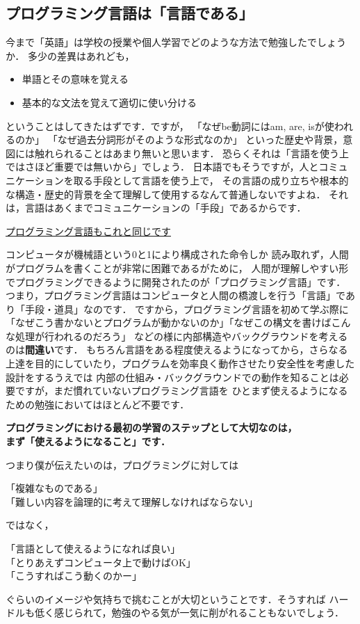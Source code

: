 \documentclass[autodetect-engine,dvi=dvipdfmx,ja=standard,a4j,12pt]{bxjsarticle}
\begin{document}
\subsection*{プログラミング言語は「言語である」}
今まで「英語」は学校の授業や個人学習でどのような方法で勉強したでしょうか．
多少の差異はあれども，
\begin{itemize}
    \item 単語とその意味を覚える
    \item 基本的な文法を覚えて適切に使い分ける
\end{itemize}
ということはしてきたはずです．ですが，
「なぜbe動詞にはam, are, isが使われるのか」
「なぜ過去分詞形がそのような形式なのか」
といった歴史や背景，意図には触れられることはあまり無いと思います．
恐らくそれは「言語を使う上ではさほど重要では無いから」でしょう．
日本語でもそうですが，人とコミュニケーションを取る手段として言語を使う上で，
その言語の成り立ちや根本的な構造・歴史的背景を全て理解して使用するなんて普通しないですよね．
それは，言語はあくまでコミュニケーションの「手段」であるからです．
\begin{center}
    \underline{\Large{プログラミング言語もこれと同じです}}
\end{center}

コンピュータが機械語という0と1により構成された命令しか
読み取れず，人間がプログラムを書くことが非常に困難であるがために，
人間が理解しやすい形でプログラミングできるように開発されたのが「プログラミング言語」です．
つまり，プログラミング言語はコンピュータと人間の橋渡しを行う「言語」であり「手段・道具」なのです．
ですから，プログラミング言語を初めて学ぶ際に「なぜこう書かないとプログラムが動かないのか」「なぜこの構文を書けばこんな処理が行われるのだろう」
などの様に内部構造やバックグラウンドを考えるのは\textbf{間違い}です．
もちろん言語をある程度使えるようになってから，さらなる上達を目的にしていたり，プログラムを効率良く動作させたり安全性を考慮した設計をするうえでは
内部の仕組み・バックグラウンドでの動作を知ることは必要ですが，まだ慣れていないプログラミング言語を
ひとまず使えるようになるための勉強においてはほとんど不要です．
\begin{center}
    \textbf{プログラミングにおける最初の学習のステップとして大切なのは，\\まず「使えるようになること」です．}
\end{center}

つまり僕が伝えたいのは，プログラミングに対しては
\begin{center}
    「複雑なものである」\\
    「難しい内容を論理的に考えて理解しなければならない」
\end{center}
ではなく，
\begin{center}
    「言語として使えるようになれば良い」\\
    「とりあえずコンピュータ上で動けばOK」\\
    「こうすればこう動くのかー」
\end{center}
ぐらいのイメージや気持ちで挑むことが大切ということです．そうすれば
ハードルも低く感じられて，勉強のやる気が一気に削がれることもないでしょう．
\end{document}
